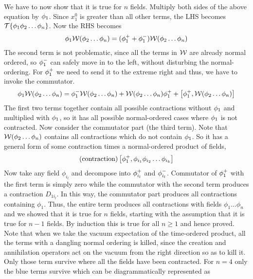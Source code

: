  We have to now show that it is true for $n$ fields. Multiply both sides of the above equation by $\phi_1$. Since $x_1^0$ is greater than all other terms, the LHS becomes $\mathcal T\{\phi_1\phi_2 \ldots \phi_n\}$. Now the RHS becomes 
 \begin{align*}
    \phi_1 \mathcal W(\phi_2\ldots\phi_n) = (\phi_{1}^+ + \phi_{1}^-) \mathcal W(\phi_2\ldots\phi_n)
 \end{align*}
 The second term is not problematic, since all the terms in $\mathcal W$ are already normal ordered, so $\phi_{1}^-$ can safely move in to the left, without disturbing the normal-ordering. For $\phi_{1}^+$ we need to send it to the extreme right and thus, we have to invoke the commutator. 
 $$ \phi_1 \mathcal W(\phi_2\ldots\phi_n) = \phi_{1}^-\mathcal W(\phi_2\ldots\phi_n) +\mathcal W(\phi_2\ldots\phi_n)\phi_{1}^+ + \left[ \phi_{1}^+, \mathcal W(\phi_2\ldots\phi_n)  \right] $$
The first two terms together contain all possible contractions without $\phi_1$ and multiplied with $\phi_1$, so it has all possible normal-ordered cases where $\phi_1$ is not contracted. Now consider the commutator part (the third term). Note that $\mathcal W(\phi_2\ldots \phi_n)$ contains all contractions which do not contain $\phi_1$. So it has a general form of some contraction times a normal-ordered product of fields, 
$$\text{(contraction)}\left[ \phi_{1}^+, \phi_{i_1}\phi_{i_2}\ldots \phi_{i_k} \right] $$
Now take any field $\phi_{i_l}$ and decompose into $\phi_{i_l}^+$ and $\phi_{i_l}^-$. Commutator of $\phi_{1}^+$ with the first term is simply zero while the commutator with the second term produces a contraction $D_{1 i_l}$. In this way, the commutator part produces all contractions containing $\phi_1$. Thus, the entire term produces all contractions with fields $\phi_1\ldots \phi_n$ and we showed that it is true for $n$ fields, starting with the assumption that it is true for $n-1$ fields. By induction this is true for all $n\geq 1$ and hence proved.\\[0.2cm]
Note that when we take the vacuum expectation of the time-ordered product, all the terms with a dangling normal ordering is killed, since the creation and annihilation operators act on the vacuum from the right direction so as to kill it. Only those term survive where all the fields have been contracted. For $n=4$ only the blue terms survive which can be diagrammatically represented as \\[0.15cm]

